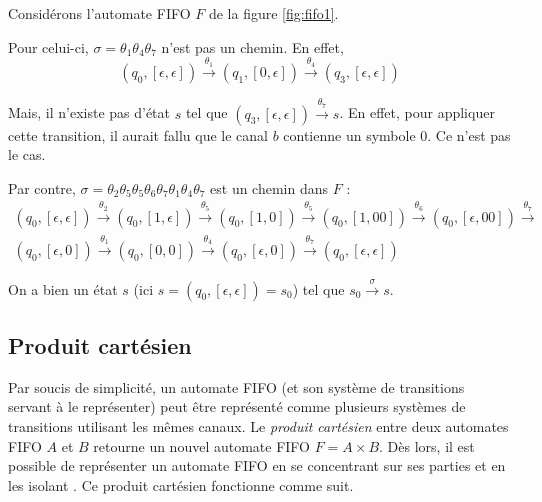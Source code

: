 \begin{example}
  Considérons l'automate FIFO $F$ de la figure \ref{fig:fifo1}.

  Pour celui-ci, $\sigma=\theta_1\theta_4\theta_7$ n'est pas un chemin. En effet,
  $$
  (q_0,[\epsilon,\epsilon])\xrightarrow{\theta_1}(q_1,[0,\epsilon])\xrightarrow{\theta_4}(q_3,[\epsilon,\epsilon])
  $$

  Mais, il n'existe pas d'état $s$ tel que $(q_3,[\epsilon,\epsilon])\xrightarrow{\theta_7}s$. En effet, pour appliquer cette transition, il aurait fallu que le canal $b$ contienne un symbole $0$. Ce n'est pas le cas.


  Par contre, $\sigma=\theta_2\theta_5\theta_5\theta_6\theta_7\theta_1\theta_4\theta_7$ est un chemin dans $F$ :
  \begin{equation*}
    \begin{gathered}
      (q_0,[\epsilon,\epsilon])\xrightarrow{\theta_2}
      (q_0,[1,\epsilon])\xrightarrow{\theta_5}
      (q_0,[1,0])\xrightarrow{\theta_5}
      (q_0,[1,00])\xrightarrow{\theta_6}
      (q_0,[\epsilon,00])\xrightarrow{\theta_7}\\
      (q_0,[\epsilon,0])\xrightarrow{\theta_1}
      (q_0,[0,0])\xrightarrow{\theta_4}
      (q_0,[\epsilon,0])\xrightarrow{\theta_7}
      (q_0,[\epsilon,\epsilon])
    \end{gathered}
  \end{equation*}

  On a bien un état $s$ (ici $s=(q_0,[\epsilon,\epsilon])=s_0$) tel que $s_0\xrightarrow{\sigma}s$.

\end{example}

\subsection{Produit cartésien}\label{ss:cartesien}

Par soucis de simplicité, un automate FIFO (et son système de transitions servant à le représenter) peut être représenté comme plusieurs systèmes de transitions utilisant les mêmes canaux. Le \emph{produit cartésien} entre deux automates FIFO $A$ et $B$ retourne un nouvel automate FIFO $F=A \times B$. Dès lors, il est possible de représenter un automate FIFO en se concentrant sur ses parties et en les isolant \cite{Suresh20}. Ce produit cartésien fonctionne comme suit.


